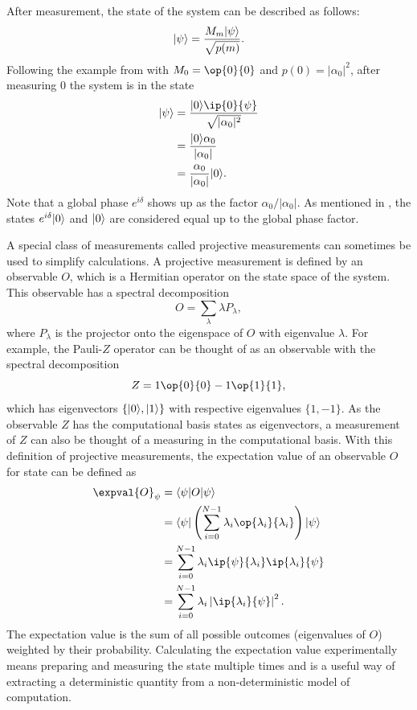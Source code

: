 After measurement, the state of the system can be described as follows:
\begin{equation}
\vert{\psi}\rangle = \dfrac{M_m\vert{\psi}\rangle}{\sqrt{p(m)}}.
\end{equation}
Following the example from  with $M_0 = \op{0}{0}$ and $p(0) = |\alpha_0|^2$, after measuring 0 the system is in the state
\begin{equation}
\begin{aligned}
\ket{\psi} &= \dfrac{\ket{0}\ip{0}{\psi}}{\sqrt{|\alpha_0|^2}} \\
&= \dfrac{\ket{0}\alpha_0}{|\alpha_0|} \\
&= \dfrac{\alpha_0}{|\alpha_0|} \ket{0}.
\end{aligned}
\end{equation}
Note that a global phase $e^{i\delta}$ shows up as the factor $\alpha_0/|\alpha_0|$.
As mentioned in , the states $e^{i\delta}\vert{0}\rangle$ and $\vert{0}\rangle$ are considered equal up to the global phase factor.

A special class of measurements called projective measurements can sometimes be used to simplify calculations.
A projective measurement is defined by an observable $O$, which is a Hermitian operator on the state space of the system.
This observable has a spectral decomposition
\begin{equation}
O = \sum_{\lambda}\lambda P_\lambda,
\end{equation}
where $P_\lambda$ is the projector onto the eigenspace of $O$ with eigenvalue $\lambda$.
For example, the Pauli-$Z$ operator can be thought of as an observable with the spectral decomposition
\begin{equation}
Z = 1\op{0}{0} - 1\op{1}{1},
\end{equation}
which has eigenvectors $\{\vert{0}\rangle, \vert{1}\rangle\}$ with respective eigenvalues $\{1, -1\}$.
As the observable $Z$ has the computational basis states as eigenvectors, a measurement of $Z$ can also be thought of a measuring in the computational basis.
With this definition of projective measurements, the expectation value of an observable $O$ for state \ket{\psi} can be defined as
\begin{equation}
\begin{aligned}
\expval{O}_\psi &= \bra{\psi}O\ket{\psi} \\
&= \bra{\psi}\left(\sum_{i=0}^{N-1}\lambda_i \op{\lambda_i}{\lambda_i} \right)\ket{\psi} \\
&= \sum_{i=0}^{N-1}\lambda_i \ip{\psi}{\lambda_i} \ip{\lambda_i}{\psi} \\
&= \sum_{i=0}^{N-1}\lambda_i \left\lvert\ip{\lambda_i}{\psi}\right\rvert^2.
\end{aligned}
\end{equation}
The expectation value is the sum of all possible outcomes (eigenvalues of $O$) weighted by their probability.
Calculating the expectation value experimentally means preparing and measuring the state multiple times and is a useful way of extracting a deterministic quantity from a non-deterministic model of computation.

